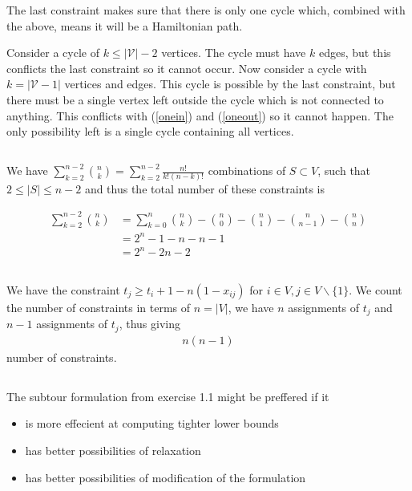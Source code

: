 \documentclass[11pt]{article}
\begin{document}
The last constraint makes sure that there is only one cycle which, combined with
the above, means it will be a Hamiltonian path. 

Consider a cycle of $k\leq|\mathcal{V}|-2$ vertices. The cycle must have $k$
edges, but this conflicts the last constraint so it cannot occur. Now consider a
cycle with $k=|\mathcal{V}-1|$ vertices and edges. This cycle is possible by the
last constraint, but there must be a single vertex left outside the cycle which
is not connected to anything. This conflicts with (\ref{onein}) and
(\ref{oneout}) so it cannot happen. The only possibility left is a single cycle
containing all vertices.


\subsection{}
We have $\sum_{k=2}^{n-2} \binom{n}{k} = \sum_{k=2}^{n-2} \frac{n!}{k!(n-k)!}$
combinations of $S \subset V$, such that $2 \leq |S| \leq n-2$ and thus the
total number of these constraints is

\begin{align}
    \sum_{k=2}^{n-2} {\binom{n}{k}}
    &= \sum_{k=0}^{n} {\binom{n}{k}}
        -\binom{n}{0}-\binom{n}{1}-\binom{n}{n-1}-\binom{n}{n} \nonumber \\
    &= 2^n-1-n-n-1 \nonumber \\
    &= 2^n-2n-2
\end{align}


\subsection{}
We have the constraint $t_j \geq t_i + 1 - n(1 - x_{ij})$ for $i\in V, j\in V\backslash \{1\}$. We count the number of constraints in terms of $n = |V|$, we have $n$ assignments of $t_j$ and $n-1$ assignments of $t_j$, thus giving
\begin{align}
    n(n-1)
\end{align}
number of constraints.

\subsection{}
The subtour formulation from exercise 1.1 might be preffered if it
\begin{itemize}
    \item is more effecient at computing tighter lower bounds
    \item has better possibilities of relaxation
    \item has better possibilities of modification of the formulation
\end{itemize}
\end{document}
